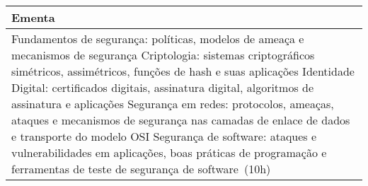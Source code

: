 \begin{quadro}[ht!]
\begin{tabular}{|p{3cm} p{2cm} p{3cm} p{2cm} p{3cm} p{2cm}|}
\multicolumn{6}{|p{15cm}|}{\cellcolor{blue1} Ementa} \\\hline
\hline\multicolumn{6}{|p{15cm}|}{\scriptsize Fundamentos de segurança: políticas, modelos de ameaça e mecanismos de segurança Criptologia: sistemas criptográficos simétricos, assimétricos, funções de hash e suas aplicações Identidade Digital: certificados digitais, assinatura digital, algoritmos de assinatura e aplicações Segurança em redes: protocolos, ameaças, ataques e mecanismos de segurança nas camadas de enlace de dados e transporte do modelo OSI Segurança de software: ataques e vulnerabilidades em aplicações, boas práticas de programação e ferramentas de teste de segurança de software (10h)}\\\hline
\hline
	\end{tabular}
\end{quadro}

